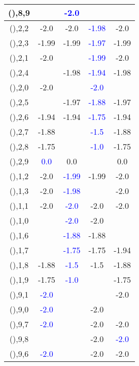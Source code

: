 \documentclass{article}
\begin{document}
\begin{center}
\begin{longtable}{|c|c|c|c|c|}
        	\hline
        	(),8,9&& \textcolor{blue}{-2.0}&&\\
        	\hline
        	(),2,2&-2.0&-2.0& \textcolor{blue}{-1.98}&-2.0\\
        	\hline
        	(),2,3&-1.99&-1.99& \textcolor{blue}{-1.97}&-1.99\\
        	\hline
        	(),2,1&-2.0&& \textcolor{blue}{-1.99}&-2.0\\
        	\hline
        	(),2,4&&-1.98& \textcolor{blue}{-1.94}&-1.98\\
        	\hline
        	(),2,0&-2.0&& \textcolor{blue}{-2.0}&\\
        	\hline
        	(),2,5&&-1.97& \textcolor{blue}{-1.88}&-1.97\\
        	\hline
        	(),2,6&-1.94&-1.94& \textcolor{blue}{-1.75}&-1.94\\
        	\hline
        	(),2,7&-1.88&& \textcolor{blue}{-1.5}&-1.88\\
        	\hline
        	(),2,8&-1.75&& \textcolor{blue}{-1.0}&-1.75\\
        	\hline
        	(),2,9& \textcolor{blue}{0.0}&0.0&&0.0\\
        	\hline
        	(),1,2&-2.0& \textcolor{blue}{-1.99}&-1.99&-2.0\\
        	\hline
        	(),1,3&-2.0& \textcolor{blue}{-1.98}&&-2.0\\
        	\hline
        	(),1,1&-2.0& \textcolor{blue}{-2.0}&-2.0&-2.0\\
        	\hline
        	(),1,0&& \textcolor{blue}{-2.0}&-2.0&\\
        	\hline
        	(),1,6&& \textcolor{blue}{-1.88}&-1.88&\\
        	\hline
        	(),1,7&& \textcolor{blue}{-1.75}&-1.75&-1.94\\
        	\hline
        	(),1,8&-1.88& \textcolor{blue}{-1.5}&-1.5&-1.88\\
        	\hline
        	(),1,9&-1.75& \textcolor{blue}{-1.0}&&-1.75\\
        	\hline
        	(),9,1& \textcolor{blue}{-2.0}&&&-2.0\\
        	\hline
        	(),9,0& \textcolor{blue}{-2.0}&&-2.0&\\
        	\hline
        	(),9,7& \textcolor{blue}{-2.0}&&-2.0&-2.0\\
        	\hline
        	(),9,8&&&-2.0& \textcolor{blue}{-2.0}\\
        	\hline
        	(),9,6& \textcolor{blue}{-2.0}&&-2.0&-2.0\\

\end{longtable}
\end{center}
\end{document}
